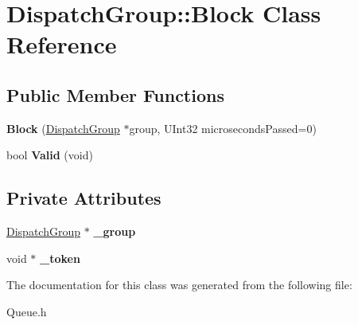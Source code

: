 \hypertarget{class_dispatch_group_1_1_block}{}\section{Dispatch\+Group\+:\+:Block Class Reference}
\label{class_dispatch_group_1_1_block}
\subsection*{Public Member Functions}
\begin{DoxyCompactItemize}
\item 
\mbox{\label{class_dispatch_group_1_1_block_a3a4f551170c1dc6537c002b7b83758ee}} 
{\bfseries Block} (\hyperlink{class_dispatch_group}{Dispatch\+Group} $\ast$group, U\+Int32 microseconds\+Passed=0)
\item 
\mbox{\label{class_dispatch_group_1_1_block_a5b5d2869429a450f4b241ecc66659654}} 
bool {\bfseries Valid} (void)
\end{DoxyCompactItemize}
\subsection*{Private Attributes}
\begin{DoxyCompactItemize}
\item 
\mbox{\label{class_dispatch_group_1_1_block_a1f6c68c1176e8d364479493efe669cfb}} 
\hyperlink{class_dispatch_group}{Dispatch\+Group} $\ast$ {\bfseries \+\_\+group}
\item 
\mbox{\label{class_dispatch_group_1_1_block_a770393a8e2890e3921b6f7af96ec1a57}} 
void $\ast$ {\bfseries \+\_\+token}
\end{DoxyCompactItemize}


The documentation for this class was generated from the following file\+:\begin{DoxyCompactItemize}
\item 
Queue.\+h\end{DoxyCompactItemize}
